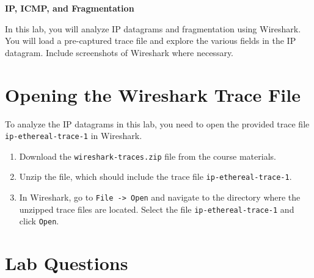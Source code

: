 \documentclass[12pt]{article}
\begin{document}
\begin{center}
    \Large \textbf{IP, ICMP, and Fragmentation}
\end{center}

\vspace{1cm}

In this lab, you will analyze IP datagrams and fragmentation using Wireshark. You will load a pre-captured trace file and explore the various fields in the IP datagram. Include screenshots of Wireshark where necessary.

\section*{Opening the Wireshark Trace File}

To analyze the IP datagrams in this lab, you need to open the provided trace file \texttt{ip-ethereal-trace-1} in Wireshark.

\begin{enumerate}
    \item Download the \texttt{wireshark-traces.zip} file from the course materials.
    \item Unzip the file, which should include the trace file \texttt{ip-ethereal-trace-1}.
    \item In Wireshark, go to \texttt{File -> Open} and navigate to the directory where the unzipped trace files are located. Select the file \texttt{ip-ethereal-trace-1} and click \texttt{Open}.
\end{enumerate}

\section*{Lab Questions}
\end{document}
